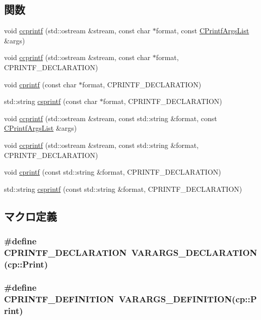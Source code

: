 \subsection*{関数}
\begin{DoxyCompactItemize}
\item 
void \hyperlink{cprintf_8hh_ab172c0b086575bda3d04daee7df17da1}{ccprintf} (std::ostream \&stream, const char $\ast$format, const \hyperlink{classVarArgs_1_1List}{CPrintfArgsList} \&args)
\item 
void \hyperlink{cprintf_8hh_a871a2a413880546a700749cb06b2e6a0}{ccprintf} (std::ostream \&stream, const char $\ast$format, CPRINTF\_\-DECLARATION)
\item 
void \hyperlink{cprintf_8hh_a46231f0e413d30a2560384d0ae05536b}{cprintf} (const char $\ast$format, CPRINTF\_\-DECLARATION)
\item 
std::string \hyperlink{cprintf_8hh_ace22d1c39f2df58e593bc49d1613eca2}{csprintf} (const char $\ast$format, CPRINTF\_\-DECLARATION)
\item 
void \hyperlink{cprintf_8hh_aa5d0d153481b44d3d471551d41fd0fe3}{ccprintf} (std::ostream \&stream, const std::string \&format, const \hyperlink{classVarArgs_1_1List}{CPrintfArgsList} \&args)
\item 
void \hyperlink{cprintf_8hh_a37efa0e15ccd2c46e909b8d16241c74a}{ccprintf} (std::ostream \&stream, const std::string \&format, CPRINTF\_\-DECLARATION)
\item 
void \hyperlink{cprintf_8hh_a28e451c18b1dfb9bbfc3669c70adf3c6}{cprintf} (const std::string \&format, CPRINTF\_\-DECLARATION)
\item 
std::string \hyperlink{cprintf_8hh_a2e89c0bfb307958ab6e3f1cd2cde8983}{csprintf} (const std::string \&format, CPRINTF\_\-DECLARATION)
\end{DoxyCompactItemize}


\subsection{マクロ定義}
\hypertarget{cprintf_8hh_ac1f7e64b606ce2859a0eae2959180f1a}{
\subsubsection[{CPRINTF\_\-DECLARATION}]{\setlength{\rightskip}{0pt plus 5cm}\#define CPRINTF\_\-DECLARATION~VARARGS\_\-DECLARATION({\bf cp::Print})}}
\label{cprintf_8hh_ac1f7e64b606ce2859a0eae2959180f1a}
\hypertarget{cprintf_8hh_a1e91b86f9dcce002fededcdbd7555ec7}{
\subsubsection[{CPRINTF\_\-DEFINITION}]{\setlength{\rightskip}{0pt plus 5cm}\#define CPRINTF\_\-DEFINITION~VARARGS\_\-DEFINITION({\bf cp::Print})}}
\label{cprintf_8hh_a1e91b86f9dcce002fededcdbd7555ec7}


